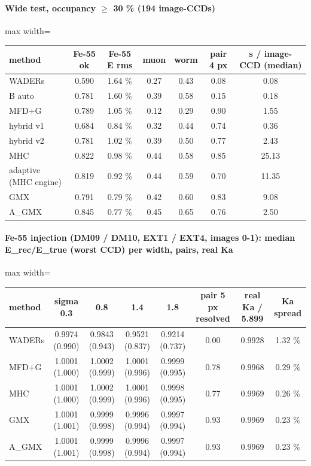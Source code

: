 \paragraph{Wide test, occupancy $\ge$ 30 \% (194 image-CCDs)}
\begin{table}[H]\centering\footnotesize
\begin{adjustbox}{max width=\linewidth}
\begin{tabular}{lcccccc}
\toprule
method & Fe-55 ok & Fe-55 E rms & muon & worm & pair 4 px & s / image-CCD (median) \\
\midrule
WADERs & 0.590 & 1.64 \% & 0.27 & 0.43 & 0.08 & 0.08 \\
B auto & 0.781 & 1.60 \% & 0.39 & 0.58 & 0.15 & 0.18 \\
MFD+G & 0.789 & 1.05 \% & 0.12 & 0.29 & 0.90 & 1.55 \\
hybrid v1 & 0.684 & 0.84 \% & 0.32 & 0.44 & 0.74 & 0.36 \\
hybrid v2 & 0.781 & 1.02 \% & 0.39 & 0.50 & 0.77 & 2.43 \\
MHC & 0.822 & 0.98 \% & 0.44 & 0.58 & 0.85 & 25.13 \\
adaptive (MHC engine) & 0.819 & 0.92 \% & 0.44 & 0.59 & 0.70 & 11.35 \\
GMX & 0.791 & 0.79 \% & 0.42 & 0.60 & 0.83 & 9.08 \\
A\_GMX & 0.845 & 0.77 \% & 0.45 & 0.65 & 0.76 & 2.50 \\
\bottomrule
\end{tabular}
\end{adjustbox}
\end{table}

\paragraph{Fe-55 injection (DM09 / DM10, EXT1 / EXT4, images 0-1): median E\_rec/E\_true (worst CCD) per width, pairs, real Ka}
\begin{table}[H]\centering\footnotesize
\begin{adjustbox}{max width=\linewidth}
\begin{tabular}{lccccccc}
\toprule
method & sigma 0.3 & 0.8 & 1.4 & 1.8 & pair 5 px resolved & real Ka / 5.899 & Ka spread \\
\midrule
WADERs & 0.9974 (0.990) & 0.9843 (0.943) & 0.9521 (0.837) & 0.9214 (0.737) & 0.00 & 0.9928 & 1.32 \% \\
MFD+G & 1.0001 (1.000) & 1.0002 (0.999) & 1.0001 (0.996) & 0.9999 (0.995) & 0.78 & 0.9968 & 0.29 \% \\
MHC & 1.0001 (1.000) & 1.0002 (0.999) & 1.0001 (0.996) & 0.9998 (0.995) & 0.77 & 0.9969 & 0.26 \% \\
GMX & 1.0001 (1.001) & 0.9999 (0.998) & 0.9996 (0.994) & 0.9997 (0.994) & 0.93 & 0.9969 & 0.23 \% \\
A\_GMX & 1.0001 (1.001) & 0.9999 (0.998) & 0.9996 (0.994) & 0.9997 (0.994) & 0.93 & 0.9969 & 0.23 \% \\
\bottomrule
\end{tabular}
\end{adjustbox}
\end{table}

